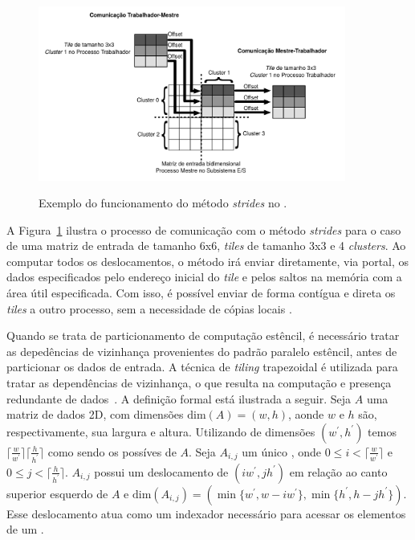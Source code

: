 \begin{figure}[t]
	\centering
    \caption{Exemplo do funcionamento do método \textit{strides} no \mppa.}
	\includegraphics[width=0.9\textwidth]{figs/stridesImage.pdf} \\
	\label{fig:strides}
\end{figure}


A Figura~\ref{fig:strides} ilustra o processo de comunicação com o método \textit{strides} para o caso de uma matriz de entrada de tamanho 6x6, \textit{tiles} de tamanho 3x3 e 4 \textit{clusters}. Ao computar todos os deslocamentos, o método irá enviar diretamente, via portal, os dados especificados pelo endereço inicial do \textit{tile} e pelos saltos na memória com a área útil especificada. Com isso, é possível enviar de forma contígua e direta os \textit{tiles} a outro processo, sem a necessidade de cópias locais \cite{Podesta:TCC}.

Quando se trata de particionamento de computação estêncil, é necessário tratar as depedências de vizinhança provenientes do padrão paralelo estêncil, antes de particionar os dados de entrada. A técnica de \textit{tiling} trapezoidal é utilizada para tratar as dependências de vizinhança, o que resulta na computação e presença redundante de dados~\cite{Rocha:2017}. A definição formal está ilustrada a seguir.
Seja $A$ uma matriz de dados 2D, com dimensões $\textrm{dim}(A) = (w, h)$, aonde $w$ e $h$ são, respectivamente, sua largura e altura.
Utilizando \tiles de dimensões $(w^\prime, h^\prime)$ temos $\lceil\frac{w}{w^\prime}\rceil\lceil\frac{h}{h^\prime}\rceil$ como sendo os possíves \tiles de $A$.
Seja $A_{i,j}$ um único \tile, onde $0\leq i < \lceil\frac{w}{ w^\prime}\rceil$ e $0\leq j < \lceil\frac{h}{ h^\prime}\rceil$.
$A_{i,j}$ possui um deslocamento de $(i w^\prime,j h^\prime)$ em relação ao canto superior esquerdo de $A$ e $\textrm{dim}(A_{i,j}) = (\min\{w^\prime, w-i w^\prime\}, \min\{h^\prime, h-j h^\prime\})$.
Esse deslocamento atua como um indexador necessário para acessar os elementos de um \tile.

